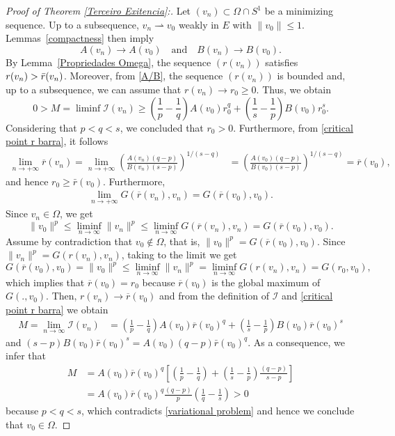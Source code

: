 \documentclass[12pt,reqno]{amsart}
\begin{document}
\begin{proof}[Proof of Theorem \ref{Terceiro Exitencia}:]
Let $(v_n)\subset \Omega\cap S^1$ be a minimizing sequence. Up to a subsequence, $v_n \rightharpoonup v_0$ weakly in $E$ with $\|v_0\|\leq1$. Lemmas~\ref{compactness} then imply
	$$A(v_n)\rightarrow A(v_0)\quad\mbox{and}\quad B(v_n)\rightarrow B(v_0).
 $$
By Lemma~\ref{Propriedades Omega}, the sequence $(r(v_n))$ satisfies $r(v_n)>\Bar{r}(v_n)$. Moreover, from \eqref{A/B}, the sequence $(r(v_n))$ is bounded and, up to a subsequence, we can assume that $r(v_n)\rightarrow r_0\geq0$. Thus, we obtain 
\[
	0>M=\liminf\mathcal{I}(v_n)\geq\left(\frac{1}{p}-\frac{1}{q}\right)A(v_0) r_0^q+\left(\frac{1}{s}-\frac{1}{p}\right)B(v_0)r_0^s.
	\]
Considering that $p<q<s$, we concluded that $r_0>0$. Furthermore,  from \eqref{critical point r barra}, it follows 
	\begin{equation*}\label{r(vn) convergence}
	\begin{aligned}
\lim_{n\rightarrow+\infty}\overline{r}(v_n)=\lim_{n\rightarrow+\infty}\left(\frac{A(v_n)(q-p)}{B(v_n)(s-p)}\right)^{1/(s-q)}&=\left(\frac{A(v_0)(q-p)}{B(v_0)(s-p)}\right)^{1/(s-q)}=\overline{r}(v_0),
\end{aligned}
	\end{equation*}
and hence $r_0\geq \bar{r}(v_0)$. Furthermore, 
	\begin{equation*}\label{G(r,vn)}
 \begin{aligned}
     	\lim_{n\rightarrow+\infty} G(\overline{r}(v_n),v_n)=G(\overline{r}(v_0), v_0).
\end{aligned}
\end{equation*}
Since $v_n \in \Omega$, we get 
	\begin{equation*}
		\|v_0\|^p\leq \liminf_{n \rightarrow \infty} \|v_n\|^p \leq \liminf_{n \rightarrow \infty} G(\overline{r}(v_n),v_n)=G(\overline{r}(v_0),v_0).
	\end{equation*}
Assume by contradiction that $v_0\not\in \Omega$, that is, 
	$
		\|v_0\|^p=G(\overline{r}(v_0),v_0)$. Since $\|v_n\|^p=G(r(v_n),v_n)$, taking to the limit we get
$$	
G(\overline{r}(v_0),v_0)=\|v_0\|^p\leq \liminf_{n \rightarrow \infty} \|v_n\|^p=\liminf_{n \rightarrow \infty}G(r(v_n),v_n)=G(r_0,v_0),
$$
which implies that $\overline{r}(v_0)=r_0$ because $\overline{r}(v_0)$ is the global maximum of $G(.,v_0)$. Then, $r(v_n)\rightarrow \overline{r}(v_0)$ and from the definition of $\mathcal{I}$ and \eqref{critical point r barra} we obtain
\begin{align*}
		M=\lim_{n \rightarrow \infty}\mathcal{I}(v_n)&= \left(\frac{1}{p}-\frac{1}{q}\right)A(v_0)\overline{r}(v_0)^q+\left(\frac{1}{s}-\frac{1}{p}\right)B(v_0)\overline{r}(v_0)^s
	\end{align*}
and $(s-p)B(v_0)\bar{r}(v_0)^s=A(v_0)(q-p)\bar{r}(v_0)^q$. As a consequence, we infer that 
\begin{align*}
		M&= A(v_0)\overline{r}(v_0)^q\left[\left(\frac{1}{p}-\frac{1}{q}\right)+\left(\frac{1}{s}-\frac{1}{p}\right)\frac{(q-p)}{s-p}\right]\\
  &=A(v_0)\overline{r}(v_0)^q\frac{(q-p)}{p}\left(\frac{1}{q}-\frac{1}{s}\right)>0
	\end{align*}
because $p<q<s$, which contradicts \eqref{variational problem} and hence we conclude that $v_0 \in \Omega$. 


\end{proof}
\end{document}
